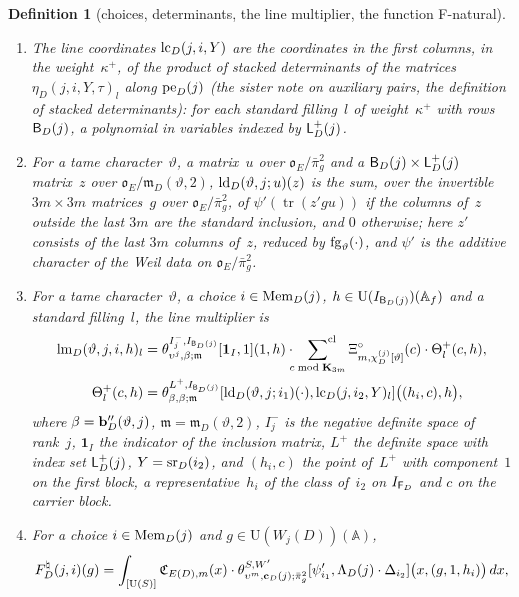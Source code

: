 \documentclass[11pt,a4paper]{article}
\newcommand{\kw}[1]{\emph{#1}}
\newcommand{\m}[1]{\mbox{$#1$}}        %
\theoremstyle{plainx}
\theoremstyle{uprightx}
\newtheorem{definition}[theorem]{Definition}
\newcommand{\AAA}{\mathbb{A}}
\newcommand{\OEr}{\mathfrak{o}_E}
\newcommand{\UU}{\mathrm{U}}
\newcommand{\KK}[1]{\mathbf{K}_{#1}}
\newcommand{\clsum}[2]{\sideset{}{^{\mathrm{cl}}}\sum_{#1\bmod #2}}
\newcommand{\tk}[7]{\theta^{#1,#2}_{#3,#4;#5}[#6,#7]}
\newcommand{\carrier}[2]{\mathfrak{C}_{#1,#2}}
\newcommand{\cXi}[3]{\Xi^{\circ}_{#1,#2}(#3)}
\newcommand{\linePoly}[1]{\Lambda_D(#1)}
\newcommand{\carrierChar}[1]{\mathbf{c}_D(#1)}
\newcommand{\detRows}[4]{\eta_{D}(#1,#2,#3,#4)}
\begin{document}
\begin{definition}[choices, determinants, the line multiplier, the function F-natural]
\begin{enumerate}[label=\textup{(\arabic*)},leftmargin=2.3em,itemsep=2pt]
in the block \m{\FlatIndex{D}}.
\item The \kw{line coordinates} \m{\linePolyCoords{j}{i}{Y}} are the coordinates in the first columns, in the
weight~$\kappa^{+}$, of the product of stacked determinants of the matrices \m{\detRows{j}{i}{Y}{\tau}_l} along
\m{\posEquiv{j}} (the sister note on auxiliary pairs, the definition of stacked determinants): for each standard filling~$l$ of
weight~$\kappa^{+}$ with rows \m{\BigIndex{j}}, a polynomial in variables indexed by \m{\LPlusIndex{j}}.
\item For a tame character~$\vartheta$, a matrix~$u$ over \m{\OEr/\bar\pi_g^{2}} and a
\m{\BigIndex{j}\times\LPlusIndex{j}} matrix~$z$ over \m{\OEr/\mathfrak{m}_D(\vartheta,2)},
\m{\lPlusDatum{\vartheta}{j}{u}{z}} is the sum, over the invertible \m{3m\times3m} matrices~$g$ over
\m{\OEr/\bar\pi_g^{2}}, of \m{\psi'(\operatorname{tr}(z'gu))} if the columns of~$z$ outside the last $3m$ are the
standard inclusion, and $0$ otherwise; here $z'$ consists of the last $3m$ columns of~$z$, reduced by
\m{\forgetTwist{\vartheta}{\cdot}}, and $\psi'$ is the additive character of the Weil data on \m{\OEr/\bar\pi_g^{2}}.
\item For a tame character~$\vartheta$, a choice \m{i\in\MemberIndex{j}}, \m{h\in\UU(I_{\BigIndex{j}})(\AAA_f)} and a
standard filling~$l$, the \kw{line multiplier} is
\begin{align*}
\lineMultiplier{\vartheta}{j}{i}{h}{l}&=\tk{I_j^{-}}{I_{\BigIndex{j}}}{\upsilon^{j}}{\beta}{\mathfrak{m}}{\mathbf{1}_{I}}{1}(1,h)\cdot\clsum{c}{\KK{3m}}\cXi{m}{\twistedChi{\vartheta}{j}}{c}\cdot\Theta^{+}_{l}(c,h),\\
\Theta^{+}_{l}(c,h)&=\tk{L^{+}}{I_{\BigIndex{j}}}{\beta}{\beta}{\mathfrak{m}}{\lPlusDatum{\vartheta}{j}{i_1}{\cdot}}{\linePolyCoords{j}{i_2}{Y}_l}\bigl((h_{i},c),h\bigr),
\end{align*}
where \m{\beta=\bigChar{\vartheta}{j}}, \m{\mathfrak{m}=\mathfrak{m}_D(\vartheta,2)}, \m{I_j^{-}} is the negative definite space of rank~$j$, \m{\mathbf{1}_I} the indicator of the inclusion
matrix, \m{L^{+}} the definite space with index set \m{\LPlusIndex{j}}, \m{Y=\shortRows{D}{i_2}}, and \m{(h_{i},c)} the
point of~$L^{+}$ with component~$1$ on the first block, a representative~$h_i$ of the class of~$i_2$ on
\m{I_{\FlatIndex{D}}} and $c$ on the carrier block.
\item For a choice \m{i\in\MemberIndex{j}} and \m{g\in\UU(W_j(D))(\AAA)},
\[\fNatural{j}{i}{g}=\int_{[\UU(S)]}\carrier{E(D)}{m}(x)\cdot\tk{S}{W'}{\upsilon^{m}}{\carrierChar{j}}{\bar\pi_g^{2}}{\psi'_{i_1}}{\linePoly{j}\cdot\Delta_{i_2}}\bigl(x,(g,1,h_{i})\bigr)\,dx,\]

\end{enumerate}
\end{definition}
\end{document}
